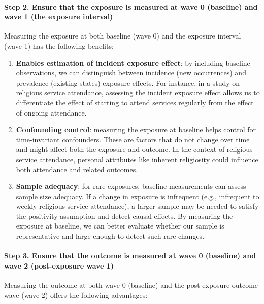 \documentclass[
  singlecolumn]{article}
\let\oldparagraph\paragraph
\renewcommand{\paragraph}[1]{\oldparagraph{#1}\mbox{}}
\begin{document}
\paragraph{Step 2. Ensure that the exposure is measured at wave 0
(baseline) and wave 1 (the exposure
interval)}\label{step-2.-ensure-that-the-exposure-is-measured-at-wave-0-baseline-and-wave-1-the-exposure-interval}

Measuring the exposure at both baseline (wave 0) and the exposure
interval (wave 1) has the following benefits:

\begin{enumerate}
\def\labelenumi{\arabic{enumi}.}
\item
  \textbf{Enables estimation of incident exposure effect}: by including
  baseline observations, we can distinguish between incidence (new
  occurrences) and prevalence (existing states) exposure effects. For
  instance, in a study on religious service attendance, assessing the
  incident exposure effect allows us to differentiate the effect of
  starting to attend services regularly from the effect of ongoing
  attendance.
\item
  \textbf{Confounding control}: measuring the exposure at baseline helps
  control for time-invariant confounders. These are factors that do not
  change over time and might affect both the exposure and outcome. In
  the context of religious service attendance, personal attributes like
  inherent religiosity could influence both attendance and related
  outcomes.
\item
  \textbf{Sample adequacy}: for rare exposures, baseline measurements
  can assess sample size adequacy. If a change in exposure is infrequent
  (e.g., infrequent to weekly religious service attendance), a larger
  sample may be needed to satisfy the positivity assumption and detect
  causal effects. By measuring the exposure at baseline, we can better
  evaluate whether our sample is representative and large enough to
  detect such rare changes.
\end{enumerate}

\paragraph{Step 3. Ensure that the outcome is measured at wave 0
(baseline) and wave 2 (post-exposure wave
1)}\label{step-3.-ensure-that-the-outcome-is-measured-at-wave-0-baseline-and-wave-2-post-exposure-wave-1}

Measuring the outcome at both wave 0 (baseline) and the post-exposure
outcome wave (wave 2) offers the following advantages:
\end{document}
